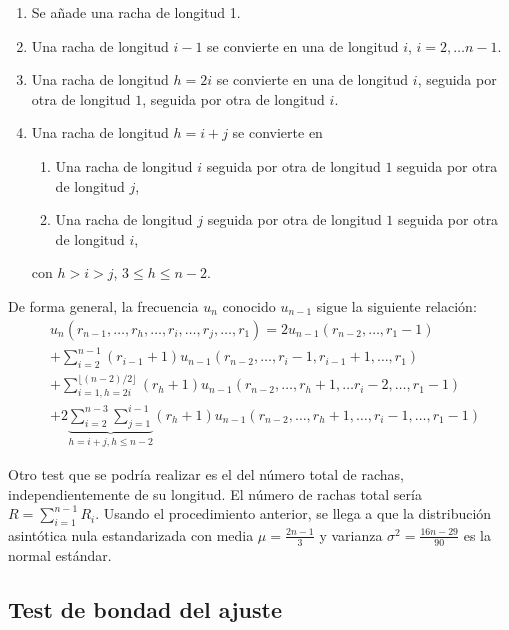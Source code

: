 \begin{enumerate}
	\item Se añade una racha de longitud 1.
	\item Una racha de longitud $i-1$ se convierte en una 
		de longitud $i$, $i=2,\dots n-1$.
	\item Una racha de longitud $h=2i$ se convierte en una de 
		longitud $i$, seguida por otra de longitud $1$, 
		seguida por otra de longitud $i$.
	\item Una racha de longitud $h=i+j$ se convierte en
	\begin{enumerate}
		\item Una racha de longitud $i$ seguida por otra de 	
			longitud $1$ seguida por otra de longitud $j$,
		\item Una racha de longitud $j$ seguida por otra de 	
			longitud $1$ seguida por otra de longitud $i$,
	\end{enumerate}
		con $h>i>j$, $3 \leq h \leq n-2$.
\end{enumerate}

	De forma general, la frecuencia $u_n$ conocido $u_{n-1}$ 
sigue la siguiente relación:
\begin{align*}
	& u_n (r_{n-1}, \dots, r_h, \dots, r_i, \dots, r_j, 
			\dots, r_1)= 
		2 u_{n-1}(r_{n-2}, \dots, r_1-1) \\
	&+ \sum\limits_{i=2}^{n-1} 
		(r_{i-1} + 1)
		u_{n-1}(r_{n-2},\dots, r_i-1, r_{i-1}+1,\dots, r_1)\\
	&+ \sum\limits_{i=1, h=2i}^{\lfloor (n-2)/2 \rfloor} 
		(r_{h} + 1)
		u_{n-1}(r_{n-2},\dots, r_h+1,\dots r_i-2,
				\dots, r_1-1)\\
	&+ 2 \underbrace{\sum\limits_{i=2}^{n-3} 
		\sum\limits_{j=1}^{i-1}}_{h=i+j, h \leq n-2}
		(r_{h} + 1)
		u_{n-1}(r_{n-2},\dots, r_h+1,\dots, r_i-1,
				\dots, r_1-1)			
\end{align*}
	
	Otro test que se podría realizar es el del número total 
de rachas, independientemente de su longitud. El número de 
rachas total sería $R = \sum\limits_{i=1}^{n-1} R_i$. Usando 
el procedimiento anterior, se llega a que la distribución 
asintótica nula estandarizada con media $\mu = 
\frac{2n-1}{3}$ y varianza $\sigma^2=\frac{16n-29}{90}$ es la 
normal estándar.
	
\subsection{Test de bondad del ajuste}

